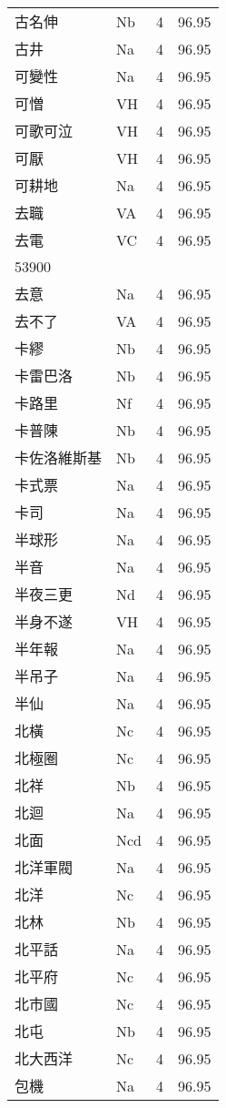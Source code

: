 \documentclass[twocolumn]{book}
\begin{document}
\begin{supertabular}{llrr}
古名伸 & Nb & 4 &  96.95\\
古井 & Na & 4 &  96.95\\
可變性 & Na & 4 &  96.95\\
可憎 & VH & 4 &  96.95\\
可歌可泣 & VH & 4 &  96.95\\
可厭 & VH & 4 &  96.95\\
可耕地 & Na & 4 &  96.95\\
去職 & VA & 4 &  96.95\\
去電 & VC & 4 &  96.95\\
53900\\
去意 & Na & 4 &  96.95\\
去不了 & VA & 4 &  96.95\\
卡繆 & Nb & 4 &  96.95\\
卡雷巴洛 & Nb & 4 &  96.95\\
卡路里 & Nf & 4 &  96.95\\
卡普陳 & Nb & 4 &  96.95\\
卡佐洛維斯基 & Nb & 4 &  96.95\\
卡式票 & Na & 4 &  96.95\\
卡司 & Na & 4 &  96.95\\
半球形 & Na & 4 &  96.95\\
半音 & Na & 4 &  96.95\\
半夜三更 & Nd & 4 &  96.95\\
半身不遂 & VH & 4 &  96.95\\
半年報 & Na & 4 &  96.95\\
半吊子 & Na & 4 &  96.95\\
半仙 & Na & 4 &  96.95\\
北橫 & Nc & 4 &  96.95\\
北極圈 & Nc & 4 &  96.95\\
北祥 & Nb & 4 &  96.95\\
北迴 & Na & 4 &  96.95\\
北面 & Ncd & 4 &  96.95\\
北洋軍閥 & Na & 4 &  96.95\\
北洋 & Nc & 4 &  96.95\\
北林 & Nb & 4 &  96.95\\
北平話 & Na & 4 &  96.95\\
北平府 & Nc & 4 &  96.95\\
北市國 & Nc & 4 &  96.95\\
北屯 & Nb & 4 &  96.95\\
北大西洋 & Nc & 4 &  96.95\\
包機 & Na & 4 &  96.95\\

\end{supertabular}
\end{document}

